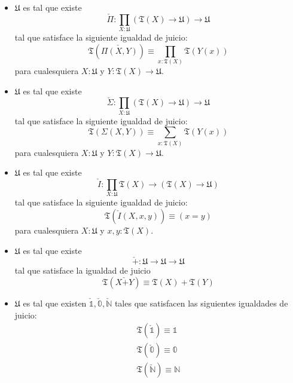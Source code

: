 \documentclass{article}
\begin{document}
\begin{definition}[Universo]
            \begin{itemize}
                \item $\mathfrak{U}$ es tal que existe 
                $$
                \check{\Pi} : \prod_{X : \mathfrak{U}} 
                    (\mathfrak{T}(X) \rightarrow \mathfrak{U}) 
                        \rightarrow \mathfrak{U}
                $$
                tal que satisface la siguiente igualdad de juicio:
                $$
                    \mathfrak{T}(\check{\Pi(X,Y)}) \equiv 
                        \prod_{x : \mathfrak{T}(X)} \mathfrak{T}(Y(x))
                $$
                para cualesquiera $X : \mathfrak{U}$ y 
                    $Y : \mathfrak{T}(X) \rightarrow \mathfrak{U}$.
                \item $\mathfrak{U}$ es tal que existe
                $$
                \check{\Sigma} : \prod_{X : \mathfrak{U}} 
                    (\mathfrak{T}(X) \rightarrow \mathfrak{U}) 
                        \rightarrow \mathfrak{U}
                $$
                tal que satisface la siguiente igualdad de juicio:
                $$
                    \mathfrak{T}(\Sigma(X,Y)) \equiv 
                        \sum\limits_{x : \mathfrak{T}(X)}\mathfrak{T}(Y(x))
                $$
                para cualesquiera $X : \mathfrak{U}$ y 
                $Y : \mathfrak{T}(X) \rightarrow \mathfrak{U}$.
                \item $\mathfrak{U}$ es tal que existe
                $$
                    \check{I} : \prod_{X : \mathfrak{U}} \mathfrak{T}(X)  
                        \rightarrow (\mathfrak{T}(X) \rightarrow \mathfrak{U})
                $$
                tal que satisface la siguiente igualdad de juicio:
                $$
                    \mathfrak{T}(\check{I}(X, x, y)) \equiv (x = y)
                $$
                para cualesquiera $X : \mathfrak{U}$ y $x,y : \mathfrak{T}(X)$.
                \item $\mathfrak{U}$ es tal que existe 
                $$
                    \check{+}:\mathfrak{U} \rightarrow \mathfrak{U} 
                        \rightarrow \mathfrak{U}
                $$
                tal que satisface la igualdad de juicio
                $$
                    \mathfrak{T}(X \check{+} Y) \equiv 
                        \mathfrak{T}(X) + \mathfrak{T}(Y)
                $$
                \item $\mathfrak{U}$ es tal que existen $\check{\mathbb{1}}, 
                \check{\mathbb{0}}, \check{\mathbb{N}}$ tales que satisfacen las 
                siguientes igualdades de juicio:
                \begin{align*}
                    \mathfrak{T}(\check{\mathbb{1}}) \equiv \mathbb{1}\\
                    \mathfrak{T}(\check{\mathbb{0}}) \equiv \mathbb{0}\\
                    \mathfrak{T}(\check{\mathbb{N}}) \equiv \mathbb{N}
                \end{align*}
            \end{itemize}
            
        \end{definition}
\end{document}
